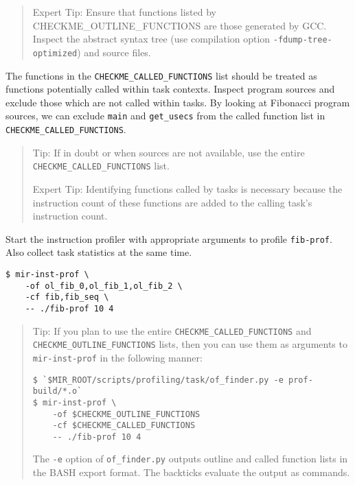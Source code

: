 \documentclass[11pt,a4paper]{article}
\begin{document}
\begin{framed}
\begin{quote}
Expert Tip: Ensure that functions listed by CHECKME\_OUTLINE\_FUNCTIONS are those generated by GCC. Inspect the abstract syntax tree (use compilation option \texttt{-fdump-tree-optimized}) and source files.
\end{quote}
\end{framed}

The functions in the \texttt{CHECKME\_CALLED\_FUNCTIONS} list should be treated as functions potentially called within task contexts.  Inspect program sources and exclude those which are not called within tasks.  By looking at Fibonacci program sources, we can exclude \texttt{main} and \texttt{get\_usecs} from the called function list in \texttt{CHECKME\_CALLED\_FUNCTIONS}.

\begin{framed}
\begin{quote}
Tip: If in doubt or when sources are not available, use the entire \texttt{CHECKME\_CALLED\_FUNCTIONS} list.

Expert Tip: Identifying functions called by tasks is necessary because the instruction count of these functions are added to the calling task's instruction count.
\end{quote}
\end{framed}

Start the instruction profiler with appropriate arguments to profile \texttt{fib-prof}.  Also collect task statistics at the same time.

\begin{lstlisting}[style=MyInputStyle]
$ mir-inst-prof \
    -of ol_fib_0,ol_fib_1,ol_fib_2 \
    -cf fib,fib_seq \
    -- ./fib-prof 10 4
\end{lstlisting}

\begin{framed}
\begin{quote}
    Tip: If you plan to use the entire \texttt{CHECKME\_CALLED\_FUNCTIONS} and \texttt{CHECKME\_OUTLINE\_FUNCTIONS} lists, then you can use them as arguments to \texttt{mir-inst-prof} in the following manner:

\begin{lstlisting}[style=MyInputStyle]
$ `$MIR_ROOT/scripts/profiling/task/of_finder.py -e prof-build/*.o`
$ mir-inst-prof \
    -of $CHECKME_OUTLINE_FUNCTIONS
    -cf $CHECKME_CALLED_FUNCTIONS
    -- ./fib-prof 10 4
\end{lstlisting}

The \texttt{-e} option of \texttt{of\_finder.py} outputs outline and called function lists in the BASH export format. The backticks evaluate the output as commands.
\end{quote}
\end{framed}
\end{document}
